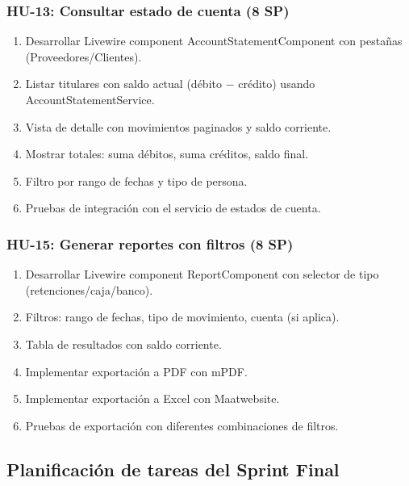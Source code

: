 \documentclass[stu]{apa7}
\begin{document}
\subsubsection{HU-13: Consultar estado de cuenta (8 SP)}

\begin{enumerate}
    \item Desarrollar Livewire component AccountStatementComponent con pestañas (Proveedores/Clientes).
    \item Listar titulares con saldo actual (débito $-$ crédito) usando AccountStatementService.
    \item Vista de detalle con movimientos paginados y saldo corriente.
    \item Mostrar totales: suma débitos, suma créditos, saldo final.
    \item Filtro por rango de fechas y tipo de persona.
    \item Pruebas de integración con el servicio de estados de cuenta.
\end{enumerate}

\subsubsection{HU-15: Generar reportes con filtros (8 SP)}

\begin{enumerate}
    \item Desarrollar Livewire component ReportComponent con selector de tipo (retenciones/caja/banco).
    \item Filtros: rango de fechas, tipo de movimiento, cuenta (si aplica).
    \item Tabla de resultados con saldo corriente.
    \item Implementar exportación a PDF con mPDF.
    \item Implementar exportación a Excel con Maatwebsite.
    \item Pruebas de exportación con diferentes combinaciones de filtros.
\end{enumerate}

\subsection{Planificación de tareas del Sprint Final}
\end{document}
